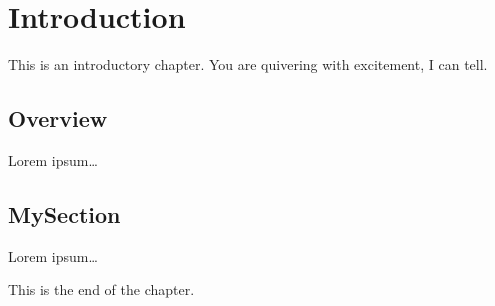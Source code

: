\chapter{Introduction}\label{sec:introduction}

This is an introductory chapter. You are quivering with excitement, I can tell.

\section{Overview}

Lorem ipsum\dots

\section{MySection}

Lorem ipsum\dots

This is the end of the chapter.